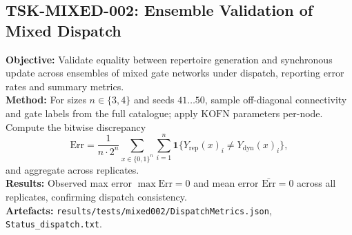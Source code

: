 \documentclass{article}
\begin{document}
\subsection{TSK-MIXED-002: Ensemble Validation of Mixed Dispatch}
\textbf{Objective:} Validate equality between repertoire generation and synchronous update across ensembles of mixed gate networks under dispatch, reporting error rates and summary metrics.\\
\textbf{Method:} For sizes \(n\in\{3,4\}\) and seeds \(41\dots 50\), sample off-diagonal connectivity and gate labels from the full catalogue; apply \(\mathrm{KOFN}\) parameters per-node. Compute the bitwise discrepancy
\[
\mathrm{Err} = \frac{1}{n\cdot 2^n} \sum_{x \in \{0,1\}^n} \sum_{i=1}^n \mathbf{1}\big\{Y_{\mathrm{rep}}(x)_i \neq Y_{\mathrm{dyn}}(x)_i\big\},
\]
and aggregate across replicates.\\
\textbf{Results:} Observed max error \(\max\mathrm{Err}=0\) and mean error \(\bar{\mathrm{Err}}=0\) across all replicates, confirming dispatch consistency.\\
\textbf{Artefacts:} \texttt{results/tests/mixed002/DispatchMetrics.json}, \texttt{Status\_dispatch.txt}.
\end{document}
